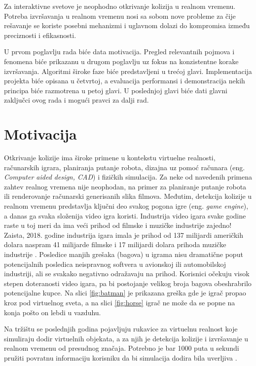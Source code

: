 \documentclass[12pt,oneside]{memoir}
\begin{document}
Za interaktivne svetove je neophodno otkrivanje kolizija u realnom vremenu. 
Potreba izvršavanja u realnom vremenu nosi sa sobom nove probleme za čije rešavanje se koriste posebni mehanizmi 
i uglavnom dolazi do kompromisa između preciznosti i efikasnosti.

U prvom poglavlju rada biće data motivacija. 
Pregled relevantnih pojmova i fenomena biće prikazanu u drugom poglavlju uz fokus na konzistentne korake izvršavanja.
Algoritmi široke faze biće predstavljeni u trećoj glavi. 
Implementacija projekta biće opisana u četvrtoj, 
a evaluacija performansi i demonstracija nekih principa biće razmotrena u petoj glavi.
U poslednjoj glavi biće dati glavni zaključci ovog rada i mogući pravci za dalji rad.

\section{Motivacija}
\label{sec:naslov1}
Otkrivanje kolizije ima široke primene u kontekstu virtuelne realnosti, računarskih igrara, planiranja putanje robota,
dizajna uz pomoć računara (eng. {\em Computer aided design, CAD}) i fizičkih simulacija. 
Za neke od navedenih primena zahtev realnog vremena nije neophodan, na primer za planiranje putanje robota ili renderovanje računarski generisanih slika filmova.
Međutim, detekcija kolizije u realnom vremenu predstavlja ključni deo svakog pogona igre (eng. {\em game engine}), a danas ga svaka složenija
video igra koristi. Industrija video igara svake godine raste \cite{game_industry}
u toj meri da ima veći prihod od filmske i muzičke industrije zajedno! Zaista, 2018. godine industrija igara imala je prihod od
137 milijardi američkih dolara naspram 41 milijarde filmske i 17 milijardi dolara prihoda muzičke industrije \cite{movie, music, game_industry}.
Posledice manjih grešaka (bagova) u igrama nisu dramatične poput potencijalnih posledica neispravnog softvera u avionskoj ili automobilskoj industriji, ali 
se svakako negativno odražavaju na prihod.
Korisnici očekuju visok stepen doteranosti video igara, pa bi postojanje velikog broja bagova 
obeshrabrilo potencijalne kupce. Na slici \ref{fig:batman} je prikazana greška gde je igrač propao kroz
pod virtuelnog sveta, a na slici \ref{fig:horse} igrač ne može da se popne na konja pošto on lebdi u vazduhu.

Na tržištu se poslednjih godina pojavljuju rukavice za virtuelnu realnost koje simuliraju dodir virtuelnih objekata, a za njih je 
detekcija kolizije i izvršavanje u realnom vremenu od presudnog značaja.
Potrebno je bar 1000 puta u sekundi pružiti povratnu informaciju korisniku da bi simulacija dodira bila uverljiva \cite{haptic}. 
\end{document}
